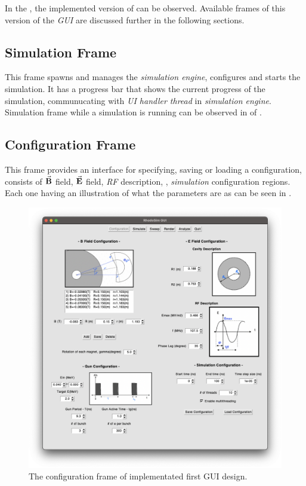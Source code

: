 \documentclass{book}
\begin{document}
In the , the implemented version of  can be observed. 
Available frames of this version of the \textit{GUI} are discussed further in the following sections.
\subsection{Simulation Frame}
This frame spawns and manages the \textit{simulation engine}, configures and starts the simulation. 
It has a progress bar that shows the current progress of the simulation, communucating with \textit{UI handler thread} in \textit{simulation engine}.
Simulation frame while a simulation is running can be observed in  of .
\clearpage
\subsection{Configuration Frame}
This frame provides an interface for specifying, saving or loading a configuration, consists of $\vec{\textbf{B}}$ field, $\vec{\textbf{E}}$ field, \textit{RF} description, \egun, \textit{simulation} configuration regions.
Each one having an illustration of what the parameters are as can be seen in .
\vspace{10pt}
\begin{figure}[h]
    \centering
    \includegraphics[width=\linewidth]{../../../figures/rhodoSim/GUI_config_frame.png}
    \caption{The configuration frame of implementated first GUI design.}
    \label{fig:gui_config}
\end{figure}
\end{document}
